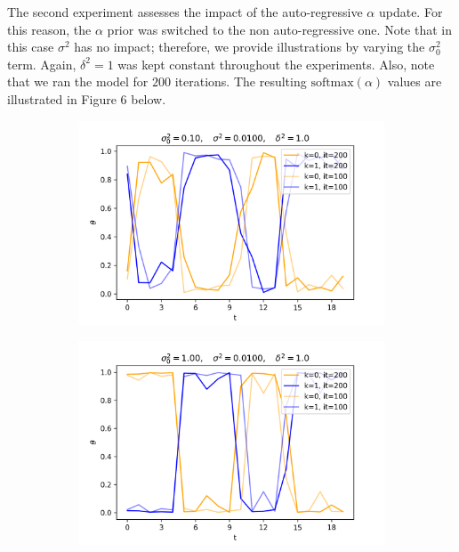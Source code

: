 \documentclass[12pt]{article}
\begin{document}
\par The second experiment assesses the impact of the auto-regressive $\alpha$ update. For this reason, the $\alpha$ prior was switched to the non auto-regressive one. Note that in this case $\sigma^2$ has no impact; therefore, we provide illustrations by varying the $\sigma^2_0$ term. Again, $\delta^2=1$ was kept constant throughout the experiments. Also, note that we ran the model for $200$ iterations. The resulting $\mbox{softmax}(\alpha)$ values are illustrated in Figure 6 below.

\begin{figure}[H]
  \begin{subfigure}[b]{0.33\textwidth}
    \includegraphics[width=\linewidth]{init_1E-01|basic_1E-02|prop_1E+00|it_200|autoreg_False}
  \end{subfigure}%
  \begin{subfigure}[b]{0.33\textwidth}
    \includegraphics[width=\linewidth]{init_1E+00|basic_1E-02|prop_1E+00|it_200|autoreg_False}

\end{subfigure}
\end{figure}
\end{document}
